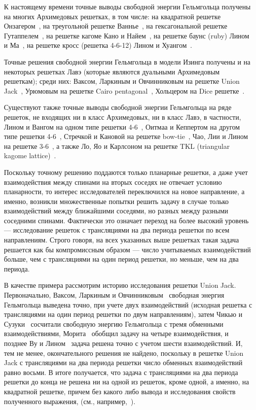 \documentclass[utf8,12pt]{jetp}
\begin{document}
К настоящему времени точные выводы свободной энергии Гельмгольца получены на многих Архимедовых  решетках, в том числе: на квадратной решетке Онзагером~\cite{onsager1941}, на треугольной решетке Ваннье~\cite{wannier1950}, на гексагональной решетке Гутаппелем~\cite{houtapell1950}, на решетке кагоме Кано и Найем~\cite{kano_naya1953}, на решетке баунс (ruby) Лином и Ма~\cite{lin1983}, на решетке кросс (решетка 4-6-12) Лином и Хуангом~\cite{lin1985}. 

Точные решения свободной энергии Гельмгольца в модели Изинга получены и на некоторых решетках Лавэ (которые являются дуальными Архимедовым  решеткам); среди них: Ваксом, Ларкиным и Овчинниковым на решетке Union Jack~\cite{vaks1965}, Урюмовым на решетке Cairo pentagonal~\cite{urumov2002}, Хольцером на Dice решетке~\cite{holzer1990}.

Существуют также точные выводы свободной энергии Гельмгольца на ряде решеток, не входящих ни в класс Архимедовых, ни в класс Лавэ, в частности, Лином и Вангом на одном типе решетки 4-6~\cite{lin1988}, Оитмаа и Кеппертом на другом типе решетки 4-6~\cite{oitmaa2002}, Стречкой и Кановой на решетке bow-tie~\cite{strecka2008}, Чао, Лии и Лином на решетке 3-6~\cite{chao1990}, а также Ло, Яо и Карлсоном на решетке TKL (triangular kagome lattice)~\cite{loh2008}.

Поскольку точному решению поддаются только планарные решетки, а даже учет взаимодействия между спинами на вторых соседях не отвечает условию планарности, то интерес исследователей переключился на новое направление, а именно, возникли множественные попытки решить задачу в случае только взаимодействий между ближайшими соседями, но разных между разными соседними спинами. Фактически это означает переход на более высокий уровень — исследование решеток с трансляциями на два периода решетки по всем направлениям. Строго говоря, на всех указанных выше решетках такая задача решается как бы компромиссным образом — число учитываемых взаимодействий больше, чем с трансляциями на один период решетки, но меньше, чем на два периода. 

В качестве примера рассмотрим историю исследования решетки Union Jack. Первоначально, Ваксом, Ларкиным и Овчинниковым~\cite{vaks1965} свободная энергия Гельмгольца выведена точно, при учете двух взаимодействий (исходная решетка с трансляциями на один период решетки по двум направлениям), затем Чикью и Сузуки~\cite{chikyu1987} сосчитали свободную энергию Гельмгольца с тремя обменными взаимодействиями, Морита~\cite{morita1986} обобщил задачу на четыре взаимодействия, и позднее Ву и Лином~\cite{wu1987} задача решена точно с учетом шести взаимодействий. И, тем не менее, окончательного решения не найдено, поскольку в решетке Union Jack с трансляциями на два периода решетки число обменных взаимодействий равно восьми. В итоге получается, что задача с трансляциями на два периода решетки до конца не решена ни на одной из решеток, кроме одной, а именно, на квадратной решетке, причем без какого либо вывода и исследования свойств полученного выражения, (см., например,~\cite{syozi1972, utiyama1951}).
\end{document}
